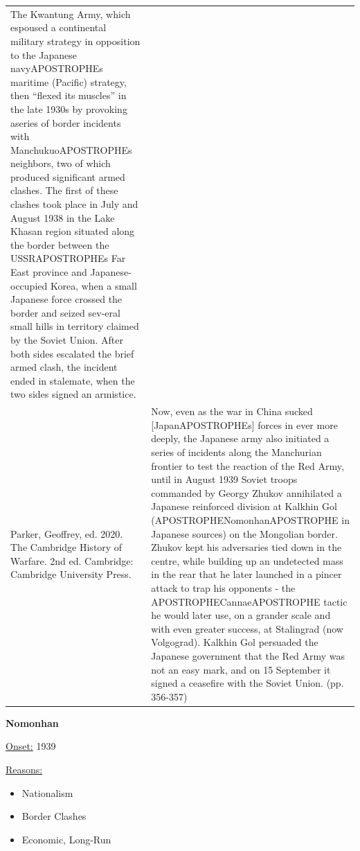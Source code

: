 {\begin{longtable}{p{}p{}}
The Kwantung Army, which espoused a continental military strategy in opposition to the Japanese navyAPOSTROPHEs maritime (Pacific) strategy, then “flexed its muscles” in the late 1930s by provoking aseries of border incidents with ManchukuoAPOSTROPHEs neighbors, two of which produced significant armed clashes. The first of these clashes took place in July and August 1938 in the Lake Khasan region situated along the border between the USSRAPOSTROPHEs Far East province and Japanese-occupied Korea, when a small Japanese force crossed the border and seized sev-eral small hills in territory claimed by the Soviet Union. After both sides escalated the brief armed clash, the incident ended in stalemate, when the two sides signed an armistice.
\\
Parker, Geoffrey, ed. 2020. The Cambridge History of Warfare. 2nd ed. Cambridge: Cambridge University Press. & Now, even as the war in China sucked [JapanAPOSTROPHEs] forces in ever more deeply, the Japanese army also initiated a series of incidents along the Manchurian frontier to test the reaction of the Red Army, until in August 1939 Soviet troops commanded by Georgy Zhukov annihilated a Japanese reinforced division at Kalkhin Gol (APOSTROPHENomonhanAPOSTROPHE in Japanese sources) on the Mongolian border. Zhukov kept his adversaries tied down in the centre, while building up an undetected mass in the rear that he later launched in a pincer attack to trap his opponents - the APOSTROPHECannaeAPOSTROPHE tactic he would later use, on a grander scale and with even greater success, at Stalingrad (now Volgograd). Kalkhin Gol persuaded the Japanese government that the Red Army was not an easy mark, and on 15 September it signed a ceasefire with the Soviet Union. (pp. 356-357)
\\
\end{longtable}}
\clearpage
         \textbf{Nomonhan} 

          \underline{Onset:} 1939         

\underline{Reasons:}
\begin{itemize}
\item Nationalism
\item Border Clashes
\item Economic, Long-Run
\end{itemize}

